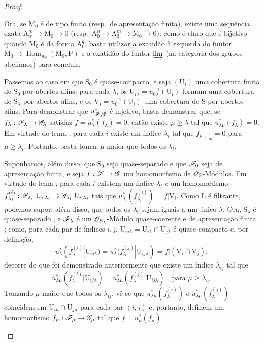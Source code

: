 \begin{proof}
\begin{enumerate}[label=(\roman*)]
Ora, se $\mathrm{M}_0$ é de tipo finito (resp.\ de apresentação finita), existe uma sequência exata $\mathrm{A}_0^m\to\mathrm{M}_0\to 0$ (resp.\ $\mathrm{A}_0^n\to\mathrm{A}_0^m\to\mathrm{M}_0\to 0$); como é claro que  é bijetivo quando $\mathrm{M}_0$ é da forma $\mathrm{A}_0^q$, basta utilizar a exatidão à esquerda do funtor $\mathrm{M}_0\mapsto\operatorname{Hom}_{\mathrm{A}_0}(\mathrm{M}_0,\mathrm{P})$ e a exatidão do funtor $\varinjlim$ (na categoria dos grupos abelianos) para concluir.

\medskip
Passemos ao caso em que $\mathrm{S}_0$ é quase-compacto, e seja $(\mathrm{U}_i)$ uma cobertura finita de $\mathrm{S}_0$ por abertos afins; para cada $\lambda$, os $\mathrm{U}_{i\lambda}=u_{0\lambda}^{-1}(\mathrm{U}_i)$ formam uma cobertura de $\mathrm{S}_\lambda$ por abertos afins, e os $\mathrm{V}_i=u_0^{-1}(\mathrm{U}_i)$ uma cobertura de $\mathrm{S}$ por abertos afins.
Para demonstrar que $u_{\mathscr{F},\mathscr{G}}^*$ é injetivo, basta demonstrar que, se $f_\lambda:\sh{F}_\lambda\to\sh{G}_\lambda$ satisfaz $f=u_\lambda^*(f_\lambda)=0$, então existe $\mu\geqslant\lambda$ tal que $u_{\lambda\mu}^*(f_\lambda)=0$.
Em virtude do lema , para cada $i$ existe um índice $\lambda_i$ tal que $f_\mu|_{\mathrm{U}_{i\mu}}=0$ para $\mu\geqslant\lambda_i$.
Portanto, basta tomar $\mu$ maior que todos os $\lambda_i$.

Suponhamos, além disso, que $\mathrm{S}_0$ seja quase-separado e que $\mathscr{F}_0$ seja de apresentação finita, e seja $f:\sh{F}\to\sh{G}$ um homomorfismo de $\mathscr{O}_\mathrm{S}$-Módulos.
Em virtude do lema , para cada $i$ existem um índice $\lambda_i$ e um homomorfismo $f_{\lambda_i}^{(i)}:\sh{F}_{\lambda_i}|\mathrm{U}_{i,\lambda_i}\to\sh{G}_{\lambda_i}|\mathrm{U}_{i,\lambda_i}$ tais que $u_{\lambda_i}^*(f_{\lambda_i}^{(i)})=f|\mathrm{V}_i$.
Como $\mathrm{L}$ é filtrante, podemos supor, além disso, que todos os $\lambda_i$ sejam iguais a um único $\lambda$.
Ora, $\mathrm{S}_\lambda$ é quase-separado , e $\mathscr{F}_\lambda$ é um $\mathscr{O}_{\mathrm{S}_\lambda}$-Módulo quase-coerente e de apresentação finita ; como, para cada par de índices $i,j$, $\mathrm{U}_{ij\lambda}=\mathrm{U}_{i\lambda}\cap\mathrm{U}_{j\lambda}$ é quase-compacto e, por definição,
\[
  u_\lambda^*(f_\lambda^{(i)}|\mathrm{U}_{ij\lambda})=u_\lambda^*(f_\lambda^{(j)}|\mathrm{U}_{ij\lambda})=f|(\mathrm{V}_i\cap\mathrm{V}_j),
\]
decorre do que foi demonstrado anteriormente que existe um índice $\lambda_{ij}$ tal que
\[
  u_{\lambda\mu}^*(f_\lambda^{(i)}|\mathrm{U}_{ij\lambda})=u_{\lambda\mu}^*(f_\lambda^{(j)}|\mathrm{U}_{ij\lambda})\quad\text{para }\mu\geqslant\lambda_{ij}.
\]
Tomando $\mu$ maior que todos os $\lambda_{ij}$, vê-se que $u_{\lambda\mu}^*(f_\lambda^{(i)})$ e $u_{\lambda\mu}^*(f_\lambda^{(j)})$ coincidem em $\mathrm{U}_{i\mu}\cap\mathrm{U}_{j\mu}$ para cada par $(i,j)$ e, portanto, definem um homomorfismo $f_\mu:\sh{F}_\mu\to\sh{G}_\mu$ tal que $f=u_\mu^*(f_\mu)$.

\end{enumerate}
\end{proof}

